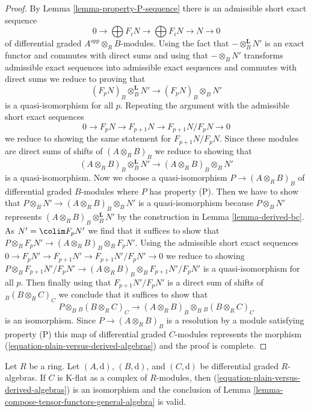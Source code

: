 \begin{proof}
\medskip\noindent
By Lemma \ref{lemma-property-P-sequence}
there is an admissible short exact sequence
$$
0 \to
\bigoplus\nolimits F_iN \to
\bigoplus\nolimits F_iN \to N \to 0
$$
of differential graded $A^{opp} \otimes_R B$-modules. Using the fact that
$- \otimes_B^\mathbf{L} N'$ is an exact functor and commutes
with direct sums and using that $- \otimes_B N'$ transforms
admissible exact sequences into admissible exact sequences
and commutes with direct sums we reduce to proving
that
$$
(F_pN)_B \otimes_B^\mathbf{L} N' \longrightarrow (F_pN)_B \otimes_B N'
$$
is a quasi-isomorphism for all $p$. Repeating the argument
with the admissible short exact sequences
$$
0 \to F_pN \to F_{p + 1}N \to F_{p + 1}N/F_pN \to 0
$$
we reduce to showing the same statement for $F_{p + 1}N/F_pN$.
Since these modules are direct sums of shifts of $(A \otimes_R B)_B$
we reduce to showing that
$$
(A \otimes_R B)_B \otimes_B^\mathbf{L} N'
\longrightarrow
(A \otimes_R B)_B \otimes_B N'
$$
is a quasi-isomorphism. Now we choose a quasi-isomorphism
$P \to (A \otimes_R B)_B$ of differential graded $B$-modules
where $P$ has property (P). Then we have to show that
$P \otimes_B N' \to (A \otimes_R B)_B \otimes_B N'$ is
a quasi-isomorphism because
$P \otimes_B N'$ represents
$(A \otimes_R B)_B \otimes_B^\mathbf{L} N'$
by the construction in Lemma \ref{lemma-derived-bc}.
As $N' = \colim F_pN'$ we find
that it suffices to show that
$P \otimes_B F_pN' \to (A \otimes_R B)_B \otimes_B F_pN'$.
Using the admissible short exact sequences
$0 \to F_pN' \to F_{p + 1}N' \to F_{p + 1}N'/F_pN' \to 0$
we reduce to showing
$P \otimes_B F_{p + 1}N'/F_pN' \to
(A \otimes_R B)_B \otimes_B F_{p + 1}N'/F_pN'$
is a quasi-isomorphism for all $p$.
Then finally using that $F_{p + 1}N'/F_pN'$
is a direct sum of shifts of ${}_B(B \otimes_R C)_C$
we conclude that it suffices to show that
$$
P \otimes_B {}_B(B \otimes_R C)_C \to
(A \otimes_R B)_B \otimes_B {}_B(B \otimes_R C)_C
$$
is an isomorphism. Since $P \to (A \otimes_R B)_B$
is a resolution by a module satisfying property (P)
this map of differential graded $C$-modules
represents the morphism (\ref{equation-plain-versus-derived-algebras})
and the proof is complete.
\end{proof}

\begin{lemma}
\label{lemma-compose-tensor-functors}
Let $R$ be a ring. Let $(A, \text{d})$, $(B, \text{d})$, and
$(C, \text{d})$ be differential graded $R$-algebras.
If $C$ is K-flat as a complex of $R$-modules, then
(\ref{equation-plain-versus-derived-algebras})
is an isomorphism and the conclusion of
Lemma \ref{lemma-compose-tensor-functors-general-algebra} is valid.
\end{lemma}

